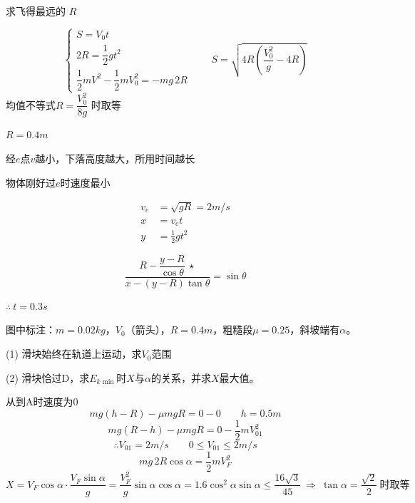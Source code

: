 \begin{problem}
求飞得最远的 $R$
\begin{solution}
\[ \begin{cases} S=V_0t\\ 2R=\dfrac12gt^2\\ \dfrac12mV^2-\dfrac12mV_0^2=-mg\,2R\end{cases}\qquad S=\sqrt{4R\left(\dfrac{V_0^2}{g}-4R\right)} \]
均值不等式\quad $R=\dfrac{V_0^2}{8g}$ 时取等
\end{solution}
\end{problem}


$R=0.4\unit{m}$

经$e$点$v$越小，下落高度越大，所用时间越长

物体刚好过$e$时速度最小

\begin{align*}
v_e&=\sqrt{gR}=2\unit{m/s}\\
x&=v_e t\\
y&=\tfrac{1}{2}gt^2
\end{align*}

\[
\frac{R-\dfrac{y-R}{\cos\theta}\ \star}{x-(y-R)\tan\theta}=\sin\theta
\]

$\therefore\ t=0.3\unit{s}$

图中标注：$m=0.02\unit{kg}$，$V_0$（箭头），$R=0.4\unit{m}$，粗糙段$\mu=0.25$，斜坡端有$\alpha$。
\begin{problem}
(1) 滑块始终在轨道上运动，求$V_0$范围

(2) 滑块恰过D，求$E_{k\min}$时$X$与$\alpha$的关系，并求$X$最大值。
\begin{solution}
从到A时速度为0
\[
mg(h-R)-\mu mgR=0-0\qquad h=0.5\unit{m}
\]
\[
mg(R-h)-\mu mgR=0-\frac{1}{2}mV_{01}^2 %
\]
\[
\therefore V_{01}=2\unit{m/s}\qquad 0\le V_{01}\le2\unit{m/s}
\]
\[
mg\,2R\cos\alpha=\frac{1}{2}mV_F^2
\]
\[
X=V_F\cos\alpha\cdot\frac{V_F\sin\alpha}{g}=\frac{V_F^2}{g}\sin\alpha\cos\alpha=1.6\cos^2\alpha\sin\alpha\le\frac{16\sqrt3}{45}\ \Rightarrow\ \tan\alpha=\frac{\sqrt2}{2}\ \text{时取等}
\]
\end{solution}
\end{problem}


